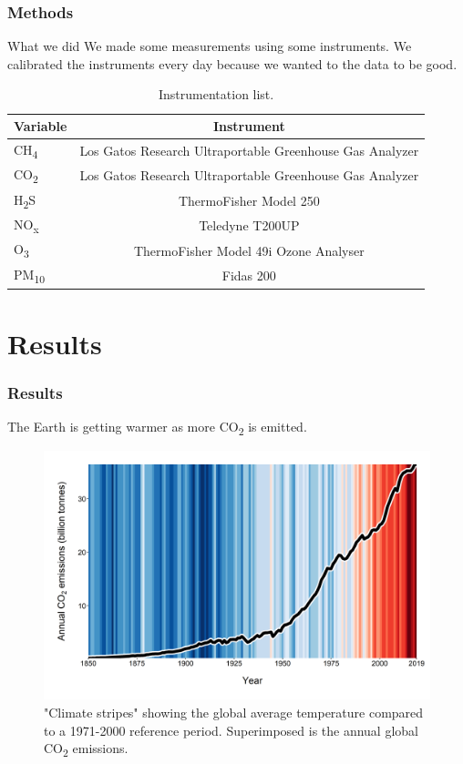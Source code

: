 \documentclass[xcolor=svgnames]{beamer}
\begin{document}
\begin{frame}
	
	\frametitle{Methods}
	
	\begin{block}{What we did}
		We made some measurements using some instruments. We calibrated the instruments every day because we wanted to the data to be good.
	\end{block}

	
	\begin{table}[h]
		\centering
		\caption{Instrumentation list.}
		\label{table:data_cap}
		\begin{tabular}{l|c}
			\hline
			Variable & Instrument\\
			\hline
			CH\textsubscript{4} & Los Gatos Research Ultraportable Greenhouse Gas Analyzer\\
			CO\textsubscript{2} & Los Gatos Research Ultraportable Greenhouse Gas Analyzer\\
			H\textsubscript{2}S & ThermoFisher Model 250\\
			NO\textsubscript{x} & Teledyne T200UP\\
			O\textsubscript{3} & ThermoFisher Model 49i Ozone Analyser\\
			PM\textsubscript{10} & Fidas 200\\
			\hline
		\end{tabular}
	\end{table}
	
\end{frame}

\section{Results}

\begin{frame}
	
	\frametitle{Results}
	
	\alert{The Earth is getting warmer as more CO\textsubscript{2} is emitted.}
	
	\begin{figure}[h]
		\centering
		\captionsetup{justification=centering}
		\includegraphics[width = .8\textwidth]{climate_stripes_co2.png}
		\caption{"Climate stripes" showing the global average temperature compared to a 1971-2000 reference period. Superimposed is the annual global CO\textsubscript{2} emissions.}
		\label{fig:climate_stripes}
	\end{figure}

\end{frame}
\end{document}

